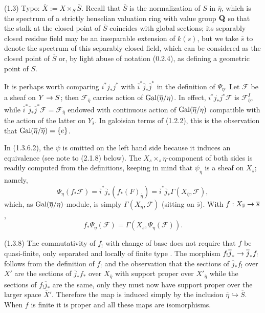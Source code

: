 \documentclass[deligne.tex]{subfiles}
\begin{document}
(1.3) Typo: $\overline X:=X\times_S\overline S$.
Recall that $\overline S$ is the normalization of $S$ in
$\overline\eta$, which is the spectrum of a strictly henselian valuation
ring with value group $\mathbf{Q}$ so that the stalk at the closed point of
$\overline S$ coincides with global sections; its separably closed residue
field may be an inseparable extension of $k(s)$, but we take $\overline s$
to denote the spectrum of this separably closed field, which can be 
considered as the closed point of $\overline S$ or, by light abuse of 
notation (0.2.4), as defining a geometric point of $S$.

It is perhaps worth comparing $i^*j_*j^*$ with
$\overline i^*\overline j_*\overline j^*$ in the definition of $\Psi_\eta$.
Let $\mathcal F$ be a sheaf on $Y\rightarrow S$;
then $\mathcal F_{\overline\eta}$ carries action of
$\operatorname{Gal}(\overline\eta/\eta)$. In effect,
$i^*j_*j^*\mathcal F$ is $\mathcal F_{\overline\eta}^I$, 
while $\overline i^*\overline j_*\overline j^*\mathcal F=\mathcal F_{\overline\eta}$ endowed with continuous action of
$\operatorname{Gal}(\overline\eta/\eta)$ compatible with the action of the latter on
$Y_{\overline s}$. In galoisian terms of (1.2.2), this is the 
observation that $\operatorname{Gal}(\overline\eta/\overline\eta)=\{e\}$.

In (1.3.6.2), the $\psi$ is omitted on the left hand side because it
induces an equivalence (see note to (2.1.8) below).
The $X_s\times_s\eta$-component of both sides is readily computed from
the definitions, keeping in mind that $\psi_{\overline\eta}$ is a sheaf
on $X_{\overline s}$; namely,
\begin{equation*}
	\Psi_{\eta}(f_*\mathcal F)
	=\overline i^*\overline j_*(f_*(F)_{\overline\eta})
	=\overline i^*\overline j_*\Gamma(X_{\overline\eta},\mathcal F),
\end{equation*}
which, as $\operatorname{Gal}(\overline\eta/\eta)$-module, is simply
$\Gamma(X_{\overline\eta},\mathcal F)$ (sitting on $\overline s$).
With $f:X_{\overline s}\rightarrow\overline s$,
\begin{equation*}
	f_*\Psi_{\eta}(\mathcal F)
	=\Gamma(X_{\overline s},\Psi_{\overline\eta}(\mathcal F)).
\end{equation*}


(1.3.8) The commutativity of $f_!$ with change of base does not require
that $f$ be quasi-finite, only separated and locally of finite type
\cite[Exp. XVII 6.1.4]{SGAA}.
The morphism $f_!\overline j_*\rightarrow\overline j_*f_!$ follows from
the definition of $f_!$ \cite[Exp. XVII 6.1.2]{SGAA} and the observation
that the sections of $\overline j_*f_!$ over $X'$ are the sections of
$\overline j_*f_*$ over $X_{\overline\eta}$ with support proper over 
$X'_{\overline\eta}$ while the sections of $f_!\overline j_*$ are the same,
only they must now have support proper over the larger space $\overline X'$. Therefore the map is induced simply by the inclusion
$\overline\eta\hookrightarrow\overline S$.
When $f$ is finite it is proper and all these maps are isomorphisms.
\end{document}
